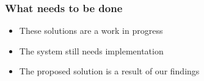 \documentclass{beamer}
\begin{document}
\begin{frame}
\frametitle{What needs to be done}
\begin{itemize}
	\item These solutions are a work in progress
	\item The system still needs implementation
	\item The proposed solution is a result of our findings
\end{itemize}
\end{frame}
\end{document}
